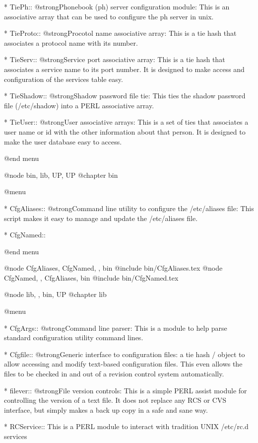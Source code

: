 * TiePh::	@strong{Phonebook (ph) server configuration module:} This is an associative array that can be used to configure the ph server in unix. 

* TieProto::	@strong{Procotol name associative array:} This is a tie hash that associates a protocol name with its number. 

* TieServ::	@strong{Service port associative array:} This is a tie hash that associates a service name to its port number.  It is designed to make access and configuration of the services table easy. 

* TieShadow::	@strong{Shadow password file tie:}  This ties the shadow password file (/etc/shadow) into a PERL associative array. 

* TieUser::	@strong{User associative arrays:} This is a set of ties that associates a user name or id with the other information about that person.  It is designed to make the user database easy to access. 

@end menu

@node bin, lib, UP, UP
@chapter bin


@menu

* CfgAliases::	@strong{Command line utility to configure the /etc/aliases file:}  This script makes it easy to manage and update the /etc/aliases file. 

* CfgNamed::	

@end menu

@node CfgAliases,	CfgNamed,	,	bin
@include bin/CfgAliases.tex
@node CfgNamed,	,	CfgAliases,	bin
@include bin/CfgNamed.tex

@node lib, , bin, UP
@chapter lib


@menu

* CfgArgs::	@strong{Command line parser:} This is a module to help parse standard configuration utility command lines. 

* Cfgfile::	@strong{Generic interface to configuration files:} a tie hash / object to allow accessing and modify text-based configuration files.  This even allows the files to be checked in and out of a revision control system automatically. 

* filever::	@strong{File version controls:} This is a simple PERL assist module for controlling the version of a text file.  It does not replace any RCS or CVS interface, but simply makes a back up copy in a safe and sane way. 

* RCService::	This is a PERL module to interact with tradition UNIX /etc/rc.d services 

